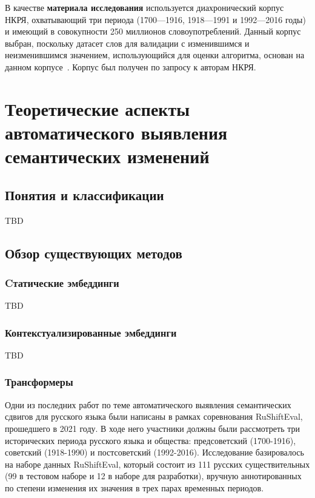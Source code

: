 \documentclass[LI,VKR]{HSEUniversity}
\begin{document}
В качестве \textbf{материала исследования} используется диахронический корпус НКРЯ, охватывающий
три периода (1700—1916, 1918—1991 и 1992—2016 годы) и имеющий в совокупности 250 миллионов
словоупотреблений.
Данный корпус выбран, поскольку датасет слов для валидации с изменившимся и неизменившимся значением,
использующийся для оценки алгоритма, основан на данном корпусе~\cite{rodina2020elmo}.
Корпус был получен по запросу к авторам НКРЯ.

\chapter{Теоретические аспекты автоматического выявления семантических изменений}

\section{Понятия и классификации}

TBD

\section{Обзор существующих методов}

\subsection{Cтатические эмбеддинги}

TBD

\subsection{Контекстуализированные эмбеддинги}

TBD

\subsection{Трансформеры}

Одни из последних работ по теме автоматического выявления семантических сдвигов для русского языка
были написаны в рамках соревнования RuShiftEval, прошедшего в 2021 году.
В ходе него участники должны были рассмотреть три исторических периода русского языка и общества:
предсоветский (1700-1916), советский (1918-1990) и постсоветский (1992-2016).
Исследование базировалось на наборе данных RuShiftEval, который состоит из
111 русских существительных (99 в тестовом наборе и 12 в наборе для разработки),
вручную аннотированных по степени изменения их значения в трех парах временных периодов.
\end{document}
